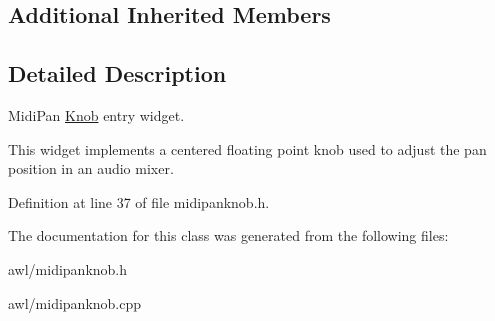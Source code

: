 \subsection*{Additional Inherited Members}


\subsection{Detailed Description}
Midi\+Pan \hyperlink{class_awl_1_1_knob}{Knob} entry widget. 

This widget implements a centered floating point knob used to adjust the pan position in an audio mixer. 

Definition at line 37 of file midipanknob.\+h.



The documentation for this class was generated from the following files\+:\begin{DoxyCompactItemize}
\item 
awl/midipanknob.\+h\item 
awl/midipanknob.\+cpp\end{DoxyCompactItemize}
